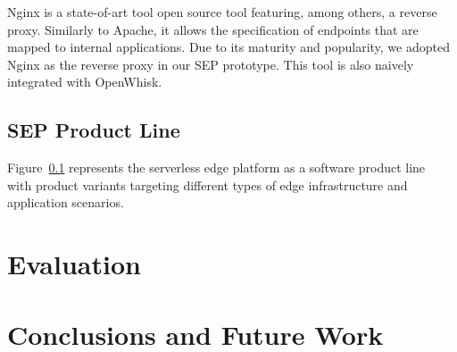 \documentclass[letterpaper, 10 pt, conference]{ieeeconf}  %
\begin{document}
Nginx is a state-of-art tool open source tool featuring, among others, a reverse proxy. Similarly to Apache, it allows the specification of endpoints that are mapped to internal applications. Due to its maturity and popularity, we adopted Nginx as the reverse proxy in our SEP prototype. This tool is also naively integrated with OpenWhisk.

\subsection{SEP Product Line}

Figure~\ref{} represents the serverless edge platform as a software product line~\cite{} with product variants targeting different types of edge infrastructure and application scenarios.





\section{Evaluation}\label{sec:evaluation}
   

\section{Conclusions and Future Work}\label{sec:conclusions}


\addtolength{\textheight}{-12cm}   %
\end{document}
